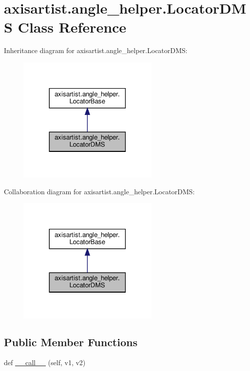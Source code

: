 \hypertarget{classaxisartist_1_1angle__helper_1_1LocatorDMS}{}\section{axisartist.\+angle\+\_\+helper.\+Locator\+D\+MS Class Reference}
\label{classaxisartist_1_1angle__helper_1_1LocatorDMS}


Inheritance diagram for axisartist.\+angle\+\_\+helper.\+Locator\+D\+MS\+:
\nopagebreak
\begin{figure}[H]
\begin{center}
\leavevmode
\includegraphics[width=197pt]{classaxisartist_1_1angle__helper_1_1LocatorDMS__inherit__graph}
\end{center}
\end{figure}


Collaboration diagram for axisartist.\+angle\+\_\+helper.\+Locator\+D\+MS\+:
\nopagebreak
\begin{figure}[H]
\begin{center}
\leavevmode
\includegraphics[width=197pt]{classaxisartist_1_1angle__helper_1_1LocatorDMS__coll__graph}
\end{center}
\end{figure}
\subsection*{Public Member Functions}
\begin{DoxyCompactItemize}
\item 
def \hyperlink{classaxisartist_1_1angle__helper_1_1LocatorDMS_aa79e493df4ee64107ef11f809aaa600e}{\+\_\+\+\_\+call\+\_\+\+\_\+} (self, v1, v2)
\end{DoxyCompactItemize}
